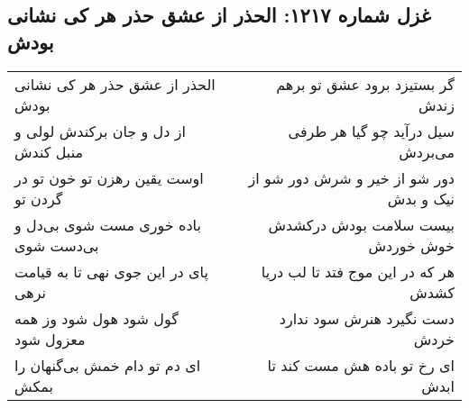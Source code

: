 \begin{center}
\section*{غزل شماره ۱۲۱۷: الحذر از عشق حذر هر کی نشانی بودش}
\label{sec:1217}
\begin{longtable}{l p{0.5cm} r}
الحذر از عشق حذر هر کی نشانی بودش
&&
گر بستیزد برود عشق تو برهم زندش
\\
از دل و جان برکندش لولی و منبل کندش
&&
سیل درآید چو گیا هر طرفی می‌بردش
\\
اوست یقین رهزن تو خون تو در گردن تو
&&
دور شو از خیر و شرش دور شو از نیک و بدش
\\
باده خوری مست شوی بی‌دل و بی‌دست شوی
&&
بیست سلامت بودش درکشدش خوش خوردش
\\
پای در این جوی نهی تا به قیامت نرهی
&&
هر که در این موج فتد تا لب دریا کشدش
\\
گول شود هول شود وز همه معزول شود
&&
دست نگیرد هنرش سود ندارد خردش
\\
ای دم تو دام خمش بی‌گنهان را بمکش
&&
ای رخ تو باده هش مست کند تا ابدش
\\
\end{longtable}
\end{center}
